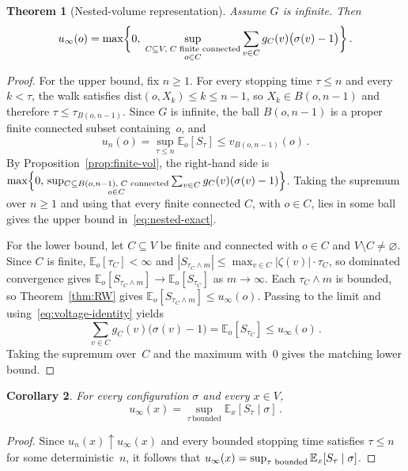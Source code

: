 \documentclass[11pt]{amsart}
\theoremstyle{plain}
\newtheorem{theorem}{Theorem}[section]
\newtheorem{corollary}[theorem]{Corollary}
\theoremstyle{definition}
\newcommand{\E}{\mathbb{E}}
\begin{document}
	\begin{theorem}[Nested-volume representation]\label{thm:nested-vol}
		Assume $G$ is infinite. Then
		\begin{equation}\label{eq:nested-exact}
			u_\infty(o)=\max\biggl\{0,\;\sup_{\substack{C\subseteq V,\; C\textup{ finite connected}\\ o\in C}}\sum_{v\in C}g_C(v)\bigl(\sigma(v)-1\bigr)\biggr\}\,.
		\end{equation}
	\end{theorem}
	
	\begin{proof}
		For the upper bound, fix $n\geq 1$. For every stopping time $\tau\leq n$ and every $k<\tau$, the walk satisfies $\mathrm{dist}(o,X_k)\leq k\leq n-1$, so $X_k\in B(o,n-1)$ and therefore $\tau\leq\tau_{B(o,n-1)}$. Since $G$ is infinite, the ball $B(o,n-1)$ is a proper finite connected subset containing~$o$, and
		\[
		u_n(o)=\sup_{\tau\leq n}\E_o[S_\tau]\leq v_{B(o,n-1)}(o)\,.
		\]
		By Proposition~\ref{prop:finite-vol}, the right-hand side is $ \max\Bigl\{0,\,\sup_{\substack{C\subseteq B(o,n-1),\; C\textup{ connected}\\ o\in C}}\sum_{v\in C} g_C(v)(\sigma(v)-1)\Bigr\}$.     
		Taking the supremum over $n\geq 1$ and using that every finite connected $C$, with $o\in C$, lies in some ball gives the upper bound in~\eqref{eq:nested-exact}.
		
		For the lower bound, let $C\subseteq V$ be finite and connected with $o\in C$ and $V\setminus C\neq\varnothing$. Since $C$ is finite, $\E_o[\tau_C]<\infty$ and $|S_{\tau_C\wedge m}|\leq\max_{v\in C}|\zeta(v)|\cdot\tau_C$, so dominated convergence gives $\E_o[S_{\tau_C\wedge m}]\to\E_o[S_{\tau_C}]$ as $m\to\infty$. Each $\tau_C\wedge m$ is bounded, so Theorem~\ref{thm:RW} gives $\E_o[S_{\tau_C\wedge m}]\leq u_\infty(o)$. Passing to the limit and using~\eqref{eq:voltage-identity} yields
		\[
		\sum_{v\in C}g_C(v)\bigl(\sigma(v)-1\bigr)=\E_o[S_{\tau_C}]\leq u_\infty(o)\,.
		\]
		Taking the supremum over~$C$ and the maximum with~$0$ gives the matching lower bound.
	\end{proof}
	
	\begin{corollary}\label{cor:RW-infinite}
		For every configuration $\sigma$ and every $x\in V$,
		\[
		u_\infty(x)=\sup_{\tau\ \mathrm{bounded}}\E_x[S_\tau\mid\sigma]\,.
		\]
	\end{corollary}
	\begin{proof}
		Since $u_n(x)\uparrow u_\infty(x)$ and every bounded stopping time satisfies $\tau\leq n$ for some deterministic~$n$, it follows that $u_\infty(x)=\sup_{\tau\textup{ bounded}}\E_x[S_\tau\mid\sigma]$.
	\end{proof}
	
\end{document}
